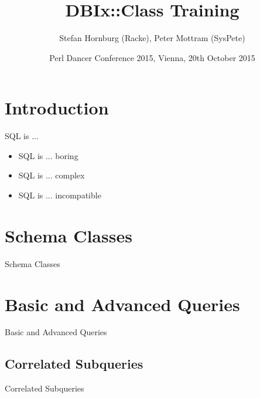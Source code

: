 \usepackage[utf8]{inputenc}
\usepackage[T1]{fontenc}
\usepackage{mathptmx}
\usepackage[scaled=.90]{helvet}
\usepackage{courier}
\usepackage{caption}
\captionsetup{labelformat=empty,labelsep=none}
\usepackage{verbatim}
\usepackage{hyperref}
\usepackage{listings}
\usepackage{ulem}
\lstset{language=Perl,basicstyle=\normalsize,tabsize=3,showstringspaces=false}

\title{DBIx::Class Training}
\author{Stefan Hornburg (Racke), Peter Mottram (SysPete)}
\date{Perl Dancer Conference 2015, Vienna, 20th October 2015}


\maketitle{}

\begin{frame}
  \titlepage
\end{frame}

\tableofcontents

\section{Introduction}

\begin{frame}{SQL is ...}
\begin{itemize}
\item SQL is ... boring
\item SQL is ... complex
\item SQL is ... incompatible
\end{itemize}
\end{frame}

\section{Schema Classes}
\begin{frame}{Schema Classes}
\end{frame}

\section{Basic and Advanced Queries}
\begin{frame}{Basic and Advanced Queries}
\end{frame}

\subsection{Correlated Subqueries}
\begin{frame}{Correlated Subqueries}
\end{frame}

